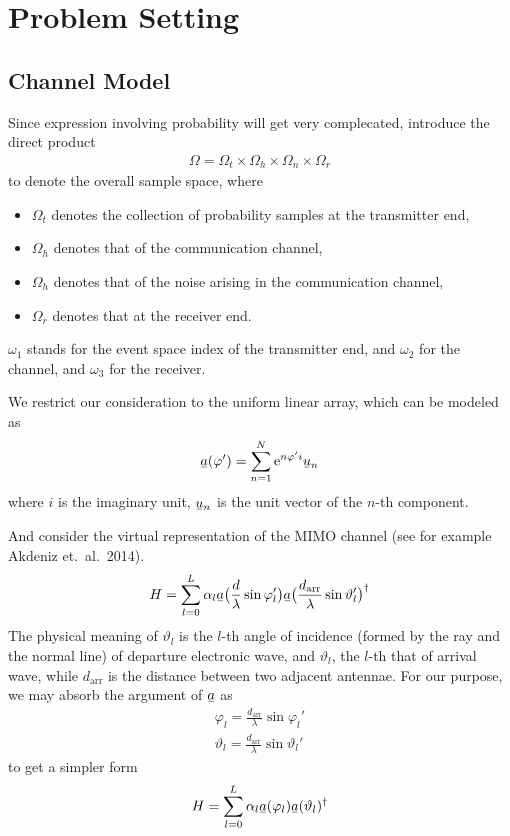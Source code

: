 \documentclass[12pt]{article}
\newcommand{\RM}[1]{\mathrm{#1}}
\newcommand{\V}[1]{\stackunder[1.2pt]{$#1$}{\rule{.9ex}{.075ex}}}
\begin{document}
\section{Problem Setting}

\subsection{Channel Model}

Since expression involving probability will get very complecated, introduce the direct product
%
\begin{gather}
\Omega
=\Omega_t \times \Omega_h \times \Omega_n \times \Omega_r
\end{gather}
%
to denote the overall sample space, where
%
\begin{itemize}
\item \(\Omega_t\) denotes the collection of probability samples at the transmitter end,
\item \(\Omega_h\) denotes that of the communication channel,
\item \(\Omega_h\) denotes that of the noise arising in the communication channel,
\item \(\Omega_r\) denotes that at the receiver end.
\end{itemize}
%
\(\omega_1\) stands for the event space index of the transmitter end, and \(\omega_2\) for the channel, and \(\omega_3\) for the receiver.


We restrict our consideration to the uniform linear array, which can be modeled as
\begin{gather}
\V{a}(\varphi')
=\sum_{n=1}^{N} \RM{e}^{n \varphi' i} \V{u}_n
\end{gather}
where \(i\) is the imaginary unit, \(\V{u}_n\) is the unit vector of the \(n\)-th component.

And consider the virtual representation of the MIMO channel (see for example Akdeniz et.\ al.\ 2014).
\begin{gather}
H
=\sum_{l=0}^L \alpha_l \V{a}\big( \frac{d}{\lambda} \sin \varphi_l' \big) \V{a}\big( \frac{d_{\RM{arr}}}{\lambda} \sin \vartheta_l' \big)^\dagger
\end{gather}
The physical meaning of \(\vartheta_l\) is the \(l\)-th angle of incidence (formed by the ray and the normal line) of departure electronic wave, and \(\vartheta_l\), the \(l\)-th that of arrival wave, while \(d_{\RM{arr}}\) is the distance between two adjacent antennae.
For our purpose, we may absorb the argument of \(\V{a}\) as
\begin{gather}
\varphi_l
=\frac{d_{\RM{arr}}}{\lambda} \sin \varphi_l' \\
\vartheta_l
=\frac{d_{\RM{arr}}}{\lambda} \sin \vartheta_l'
\end{gather}
to get a simpler form
\begin{gather}
H
=\sum_{l=0}^L \alpha_l \V{a}(\varphi_l) \V{a}(\vartheta_l)^\dagger
\end{gather}
\end{document}
